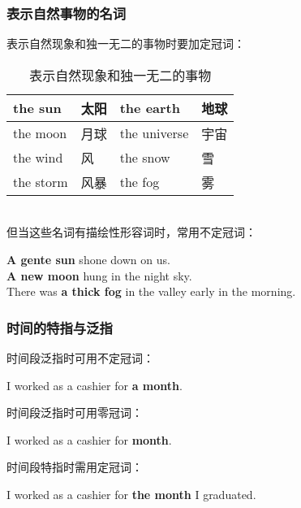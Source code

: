 \documentclass[UTF8]{ctexart}
\begin{document}
\subsubsection{表示自然事物的名词}
    表示自然现象和独一无二的事物时要加定冠词：
    \begin{table}[h!]
        \begin{center}
            \ttfamily
            \begin{tabular}{p{70pt}|p{40pt}|p{70pt}|p{40pt}}
                \hline
                the sun&太阳&the earth&地球\\ \hline
                the moon&月球&the universe&宇宙\\ \hline
                the wind&风&the snow&雪\\ \hline
                the storm&风暴&the fog&雾\\ \hline
            \end{tabular}
            \rmfamily
            \caption{表示自然现象和独一无二的事物}
        \end{center}
    \end{table}\\
    但当这些名词有描绘性形容词时，常用不定冠词：
    \begin{center}
        \large\ttfamily
        \textbf{A gente sun} shone down on us.\\[3mm]
        \textbf{A new moon} hung in the night sky.\\[3mm]
        There was \textbf{a thick fog} in the valley early in the morning.
    \end{center}

\newpage

\subsubsection{时间的特指与泛指}
    时间段泛指时可用不定冠词：
    \begin{center}
        \large\ttfamily
        I worked as a cashier for \textbf{a month}.\\[6mm]
    \end{center}
    时间段泛指时可用零冠词：
    \begin{center}
        \large\ttfamily
        I worked as a cashier for \textbf{month}.\\[6mm]
    \end{center}
    时间段特指时需用定冠词：
    \begin{center}
        \large\ttfamily
        I worked as a cashier for \textbf{the month} I graduated.
    \end{center}\vspace{5pt}
\end{document}
